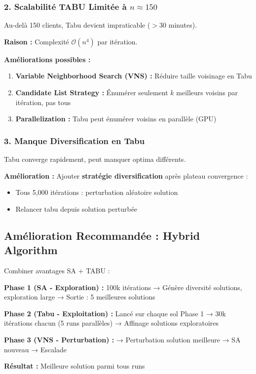 \documentclass[12pt,a4paper,twoside]{report}
\begin{document}
\subsubsection{2. Scalabilité TABU Limitée à $n \approx 150$}

Au-delà 150 clients, Tabu devient impraticable ($> 30$ minutes).

\textbf{Raison :} Complexité $\mathcal{O}(n^4)$ par itération.

\textbf{Améliorations possibles :}
\begin{enumerate}
    \item \textbf{Variable Neighborhood Search (VNS) :} Réduire taille voisinage en Tabu
    \item \textbf{Candidate List Strategy :} Énumérer seulement $k$ meilleurs voisins par itération, pas tous
    \item \textbf{Parallelization :} Tabu peut énumérer voisins en parallèle (GPU)
\end{enumerate}

\subsubsection{3. Manque Diversification en Tabu}

Tabu converge rapidement, peut manquer optima différents.

\textbf{Amélioration :} Ajouter \textbf{stratégie diversification} après plateau convergence :
\begin{itemize}
    \item Tous 5,000 itérations : perturbation aléatoire solution
    \item Relancer tabu depuis solution perturbée
\end{itemize}

\subsection{Amélioration Recommandée : Hybrid Algorithm}

Combiner avantages SA + TABU :

\begin{algorithm}[H]
    \caption{Hybrid SA-Tabu (proposition amélioration)}
    \begin{algorithmic}
        \State \textbf{Phase 1 (SA - Exploration) :} 100k itérations
        \State \quad → Génère diversité solutions, exploration large
        \State \quad → Sortie : 5 meilleures solutions

        \State \textbf{Phase 2 (Tabu - Exploitation) :} Lancé sur chaque sol Phase 1
        \State \quad → 30k itérations chacun (5 runs parallèles)
        \State \quad → Affinage solutions exploratoires

        \State \textbf{Phase 3 (VNS - Perturbation) :}
        \State \quad → Perturbation solution meilleure → SA nouveau
        \State \quad → Escalade

        \State \textbf{Résultat :} Meilleure solution parmi tous runs
    \end{algorithmic}
\end{algorithm}
\end{document}
